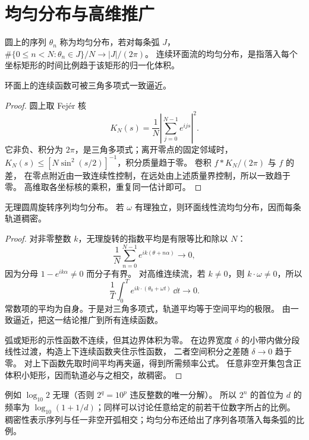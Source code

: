 \section{均匀分布与高维推广}
\begin{definition}
圆上的序列 $\theta_n$ 称为均匀分布，若对每条弧 $J$，
$\#\{0\leq n<N:\theta_n\in J\}/N\to|J|/(2\pi)$。
连续环面流的均匀分布，是指落入每个坐标矩形的时间比例趋于该矩形的归一化体积。
\end{definition}
\begin{lemma}[三角多项式逼近]
环面上的连续函数可被三角多项式一致逼近。
\end{lemma}
\begin{proof}
圆上取 Fejér 核
\[
 K_N(s)=\frac1N\left|\sum_{j=0}^{N-1}e^{ijs}\right|^2.
\]
它非负、积分为 $2\pi$，是三角多项式；离开零点的固定邻域时，
$K_N(s)\leq[N\sin^2(s/2)]^{-1}$，积分质量趋于零。
卷积 $f*K_N/(2\pi)$ 与 $f$ 的差，
在零点附近由一致连续性控制，在远处由上述质量界控制，所以一致趋于零。
高维取各坐标核的乘积，重复同一估计即可。
\end{proof}
\begin{theorem}
无理圆周旋转序列均匀分布。
若 $\omega$ 有理独立，则环面线性流均匀分布，因而每条轨道稠密。
\end{theorem}
\begin{proof}
对非零整数 $k$，无理旋转的指数平均是有限等比和除以 $N$：
\[
 \frac1N\sum_{n=0}^{N-1}e^{ik(\theta+n\alpha)}\longrightarrow0,
\]
因为分母 $1-e^{ik\alpha}\ne0$ 而分子有界。
对高维连续流，若 $k\ne0$，则 $k\cdot\omega\ne0$，所以
\[
 \frac1T\int_0^Te^{ik\cdot(\theta_0+\omega t)}\,\dd t\longrightarrow0.
\]
常数项的平均为自身。于是对三角多项式，轨道平均等于空间平均的极限。
由一致逼近，把这一结论推广到所有连续函数。

弧或矩形的示性函数不连续，但其边界体积为零。
在边界宽度 $\delta$ 的小带内做分段线性过渡，构造上下连续函数夹住示性函数，
二者空间积分之差随 $\delta\to0$ 趋于零。
对上下函数先取时间平均再夹逼，得到所需频率公式。
任意非空开集包含正体积小矩形，因而轨道必与之相交，故稠密。
\end{proof}
例如 $\log_{10}2$ 无理（否则 $2^q=10^p$ 违反整数的唯一分解）。
所以 $2^n$ 的首位为 $d$ 的频率为
$\log_{10}(1+1/d)$；同样可以讨论任意给定的前若干位数字所占的比例。
稠密性表示序列与任一非空开弧相交；均匀分布还给出了序列各项落入每条弧的比例。
